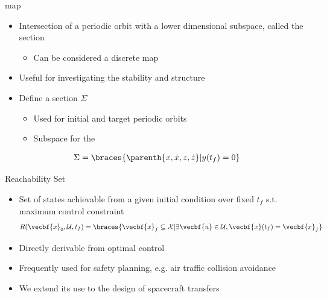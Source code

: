 \begin{frame}{\Poincare map}
\begin{itemize}
    \item Intersection of a periodic orbit with a lower dimensional subspace, called the \Poincare section
    \pause
        \begin{itemize}
            \item Can be considered a discrete map 
        \end{itemize}
        \pause
    \item Useful for investigating the stability and structure 
    \pause
    \item Define a \Poincare section \( \Sigma \) 
        \begin{itemize}
            \item Used for initial and target periodic orbits
            \item Subspace for the 
        \end{itemize}
\end{itemize}

\begin{align*}
    \Sigma = \braces{\parenth{x, \dot{x}, z, \dot{z}} | y(t_f) = 0 }
\end{align*}

\end{frame}

\begin{frame}{Reachability Set}

\begin{itemize}
    \item Set of states achievable from a given initial condition over fixed \( t_f \) s.t. maximum control constraint
    \begin{align*}
        R( \vecbf{x}_0, \mathcal{U} , t_f) = \braces{ \vecbf{x}_f \subseteq \mathcal{X} | \exists \vecbf{u} \in \mathcal{U}, \vecbf{x}(t_f) = \vecbf{x}_f }
    \end{align*}
    \pause
    \item Directly derivable from optimal control
    \item Frequently used for safety planning, e.g. air traffic collision avoidance
    \pause
    \item We extend its use to the design of spacecraft transfers
\end{itemize}

\end{frame}

